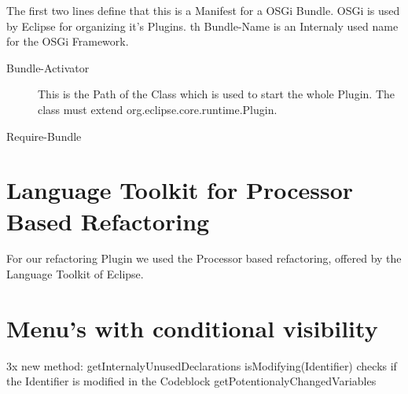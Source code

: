 \documentclass[a4paper,10pt]{report}
\begin{document}
The first two lines define that this is a Manifest for a OSGi Bundle. OSGi is used by Eclipse for organizing it's Plugins.
th Bundle-Name is an Internaly used name for the OSGi Framework. 

\begin{description}
 \item[Bundle-Activator] This is the Path of the Class which is used to start the whole Plugin. The class must extend org.eclipse.core.runtime.Plugin. 
 \item[Require-Bundle]
 \end{description}


\section{Language Toolkit for Processor Based Refactoring}
For our refactoring Plugin we used the Processor based refactoring, offered by the Language Toolkit of Eclipse. 

\section{Menu's with conditional visibility}

3x new method:
getInternalyUnusedDeclarations
isModifying(Identifier) checks if the Identifier is modified in the Codeblock
getPotentionalyChangedVariables
\end{document}
